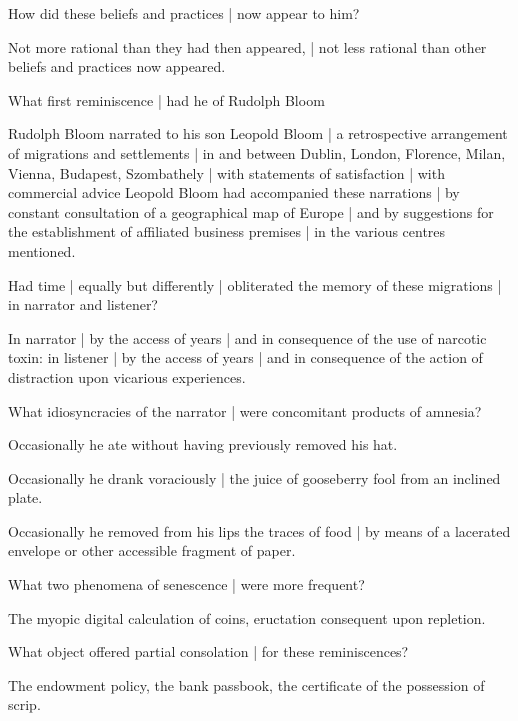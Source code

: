 How did these beliefs and practices |
now appear to him?

\Philosophy
Not more rational than they had then appeared, |
not less rational than other beliefs and practices now appeared.


What first reminiscence |
had he of Rudolph Bloom

\Memories
Rudolph Bloom
narrated to his son Leopold Bloom
 |
a retrospective arrangement of migrations and settlements |
in and between Dublin, London, Florence, Milan, Vienna, Budapest, Szombathely |
with statements of satisfaction
 |
with commercial advice
Leopold Bloom
had accompanied these narrations |
by constant consultation of a geographical map of Europe
 |
and by suggestions for the establishment of affiliated business premises |
in the various centres mentioned.


Had time |
equally but differently |
obliterated the memory of these migrations |
in narrator and listener?

\Science
In narrator |
by the access of years |
and in consequence of the use of narcotic toxin:
in listener |
by the access of years |
and in consequence of the action of distraction upon vicarious experiences.%


What idiosyncracies of the narrator |
were concomitant products of amnesia?

\Factual
Occasionally he ate without having previously removed his hat.

\Household
Occasionally he drank voraciously |
the juice of gooseberry fool from an inclined plate.

\Science
Occasionally he removed from his lips the traces of food |
by means of a lacerated envelope or other accessible fragment of paper.


What two phenomena of senescence |
were more frequent?

\Science
The myopic digital calculation of coins,
eructation consequent upon repletion.


What object offered partial consolation |
for these reminiscences?%

\Factual[~(legal)]
The endowment policy, the bank passbook,
the certificate of the possession of scrip.


